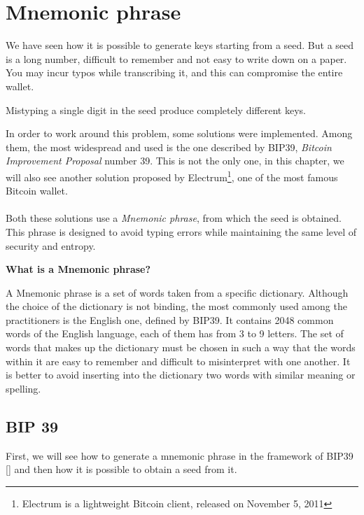 
\chapter{Mnemonic phrase} %

\label{mnemonic} %


We have seen how it is possible to generate keys starting from a seed. But a seed is a long number, difficult to remember and not easy to write down on a paper. You may incur typos while transcribing it, and this can compromise the entire wallet.
\begin{remark}
	Mistyping a single digit in the seed produce completely different keys.
\end{remark}
In order to work around this problem, some solutions were implemented. Among them, the most widespread and used is the one described by BIP39, \textit{Bitcoin Improvement Proposal} number 39. This is not the only one, in this chapter, we will also see another solution proposed by Electrum\footnote{Electrum is a lightweight Bitcoin client, released on November 5, 2011}, one of the most famous Bitcoin wallet.
\\ \\
Both these solutions use a \textit{Mnemonic phrase}, from which the seed is obtained. This phrase is designed to avoid typing errors while maintaining the same level of security and entropy.
\begin{flushleft}
	\textbf{What is a Mnemonic phrase?}
\end{flushleft}
A Mnemonic phrase is a set of words taken from a specific dictionary. Although the choice of the dictionary is not binding, the most commonly used among the practitioners is the English one, defined by BIP39. It contains 2048 common words of the English language, each of them has from 3 to 9 letters. The set of words that makes up the dictionary must be chosen in such a way that the words within it are easy to remember and difficult to misinterpret with one another. It is better to avoid inserting into the dictionary two words with similar meaning or spelling.

\section{BIP 39}
First, we will see how to generate a mnemonic phrase in the framework of BIP39 [\cite{2}] and then how it is possible to obtain a seed from it.

